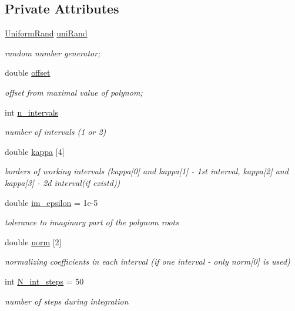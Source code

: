 \subsection*{Private Attributes}
\begin{DoxyCompactItemize}
\item 
\hyperlink{class_p_c_a_1_1_uniform_rand}{Uniform\+Rand} \hyperlink{class_p_c_a_1_1_double_well_rand_a44577274c594e30092748eb446d8dd40}{uni\+Rand}
\begin{DoxyCompactList}\small\item\em random number generator; \end{DoxyCompactList}\item 
double \hyperlink{class_p_c_a_1_1_double_well_rand_abad044e066c9b93b3eacb6d36440f650}{offset}
\begin{DoxyCompactList}\small\item\em offset from maximal value of polynom; \end{DoxyCompactList}\item 
int \hyperlink{class_p_c_a_1_1_double_well_rand_a89c48e652127b71600906d93f628dad5}{n\+\_\+intervals}
\begin{DoxyCompactList}\small\item\em number of intervals (1 or 2) \end{DoxyCompactList}\item 
double \hyperlink{class_p_c_a_1_1_double_well_rand_a4792680466fc8f865be362937b3e4e3b}{kappa} \mbox{[}4\mbox{]}
\begin{DoxyCompactList}\small\item\em borders of working intervals (kappa\mbox{[}0\mbox{]} and kappa\mbox{[}1\mbox{]} -\/ 1st interval, kappa\mbox{[}2\mbox{]} and kappa\mbox{[}3\mbox{]} -\/ 2d interval(if existd)) \end{DoxyCompactList}\item 
double \hyperlink{class_p_c_a_1_1_double_well_rand_a5fa2e0c609851d3e8a8cb9eb4bbd90c6}{im\+\_\+epsilon} = 1e-\/5
\begin{DoxyCompactList}\small\item\em tolerance to imaginary part of the polynom roots \end{DoxyCompactList}\item 
double \hyperlink{class_p_c_a_1_1_double_well_rand_aa31900946aeacdd5f462704393b93413}{norm} \mbox{[}2\mbox{]}
\begin{DoxyCompactList}\small\item\em normalizing coefficients in each interval (if one interval -\/ only norm\mbox{[}0\mbox{]} is used) \end{DoxyCompactList}\item 
int \hyperlink{class_p_c_a_1_1_double_well_rand_a935058a518ed28d62b9e2285c30382dc}{N\+\_\+int\+\_\+steps} = 50
\begin{DoxyCompactList}\small\item\em number of steps during integration \end{DoxyCompactList}\end{DoxyCompactItemize}
